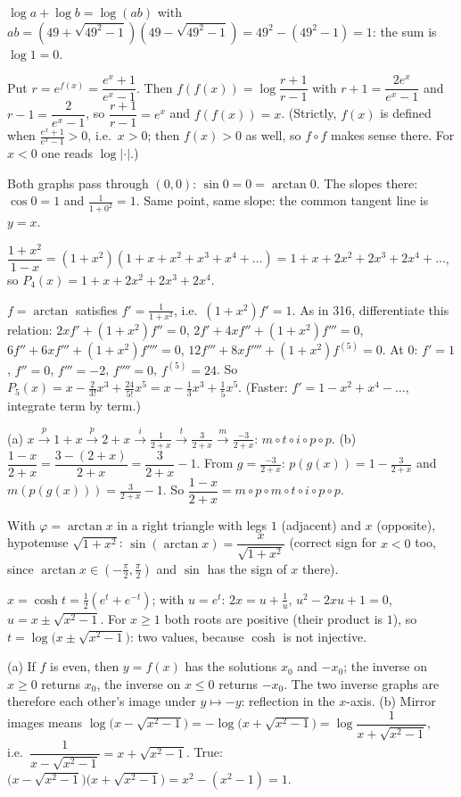  $\log a+\log b=\log(ab)$ with $ab=(49+\sqrt{49^2-1})(49-\sqrt{49^2-1})=49^2-(49^2-1)=1$: the sum is $\log1=0$.

 Put $r=e^{f(x)}=\dfrac{e^x+1}{e^x-1}$. Then $f(f(x))=\log\dfrac{r+1}{r-1}$ with $r+1=\dfrac{2e^x}{e^x-1}$ and $r-1=\dfrac2{e^x-1}$, so $\dfrac{r+1}{r-1}=e^x$ and $f(f(x))=x$. (Strictly, $f(x)$ is defined when $\frac{e^x+1}{e^x-1}>0$, i.e.\ $x>0$; then $f(x)>0$ as well, so $f\circ f$ makes sense there. For $x<0$ one reads $\log|\cdot|$.)

 Both graphs pass through $(0,0)$: $\sin0=0=\arctan0$. The slopes there: $\cos0=1$ and $\frac1{1+0^2}=1$. Same point, same slope: the common tangent line is $y=x$.

 $\dfrac{1+x^2}{1-x}=(1+x^2)(1+x+x^2+x^3+x^4+\dots)=1+x+2x^2+2x^3+2x^4+\dots$, so $P_4(x)=1+x+2x^2+2x^3+2x^4$.

 $f=\arctan$ satisfies $f'=\frac1{1+x^2}$, i.e.\ $(1+x^2)f'=1$. As in 316, differentiate this relation: $2xf'+(1+x^2)f''=0$, $2f'+4xf''+(1+x^2)f'''=0$, $6f''+6xf'''+(1+x^2)f''''=0$, $12f'''+8xf''''+(1+x^2)f^{(5)}=0$. At $0$: $f'=1$, $f''=0$, $f'''=-2$, $f''''=0$, $f^{(5)}=24$. So $P_5(x)=x-\frac2{3!}x^3+\frac{24}{5!}x^5=x-\frac13x^3+\frac15x^5$. (Faster: $f'=1-x^2+x^4-\dots$, integrate term by term.)

 (a) $x\xrightarrow{p}1+x\xrightarrow{p}2+x\xrightarrow{i}\frac1{2+x}\xrightarrow{t}\frac3{2+x}\xrightarrow{m}\frac{-3}{2+x}$: $m\circ t\circ i\circ p\circ p$. (b) $\dfrac{1-x}{2+x}=\dfrac{3-(2+x)}{2+x}=\dfrac3{2+x}-1$. From $g=\frac{-3}{2+x}$: $p(g(x))=1-\frac3{2+x}$ and $m(p(g(x)))=\frac3{2+x}-1$. So $\dfrac{1-x}{2+x}=m\circ p\circ m\circ t\circ i\circ p\circ p$.

 With $\varphi=\arctan x$ in a right triangle with legs $1$ (adjacent) and $x$ (opposite), hypotenuse $\sqrt{1+x^2}$: $\sin(\arctan x)=\dfrac x{\sqrt{1+x^2}}$ (correct sign for $x<0$ too, since $\arctan x\in(-\frac\pi2,\frac\pi2)$ and $\sin$ has the sign of $x$ there).

 $x=\cosh t=\frac12(e^t+e^{-t})$; with $u=e^t$: $2x=u+\frac1u$, $u^2-2xu+1=0$, $u=x\pm\sqrt{x^2-1}$. For $x\ge1$ both roots are positive (their product is $1$), so $t=\log\big(x\pm\sqrt{x^2-1}\big)$: two values, because $\cosh$ is not injective.

 (a) If $f$ is even, then $y=f(x)$ has the solutions $x_0$ and $-x_0$; the inverse on $x\ge0$ returns $x_0$, the inverse on $x\le0$ returns $-x_0$. The two inverse graphs are therefore each other's image under $y\mapsto-y$: reflection in the $x$-axis. (b) Mirror images means $\log\big(x-\sqrt{x^2-1}\big)=-\log\big(x+\sqrt{x^2-1}\big)=\log\dfrac1{x+\sqrt{x^2-1}}$, i.e.\ $\dfrac1{x-\sqrt{x^2-1}}=x+\sqrt{x^2-1}$. True: $\big(x-\sqrt{x^2-1}\big)\big(x+\sqrt{x^2-1}\big)=x^2-(x^2-1)=1$.

